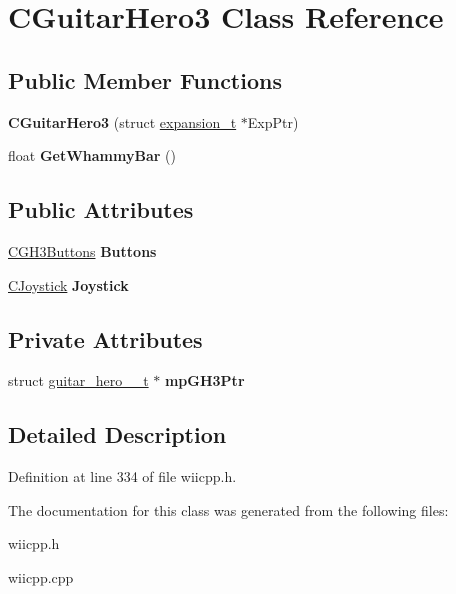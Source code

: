 \hypertarget{class_c_guitar_hero3}{\section{\-C\-Guitar\-Hero3 \-Class \-Reference}
\label{class_c_guitar_hero3}
}
\subsection*{\-Public \-Member \-Functions}
\begin{DoxyCompactItemize}
\item 
\hypertarget{class_c_guitar_hero3_afbef4e83211e146d2aef1064fcc24bb7}{{\bfseries \-C\-Guitar\-Hero3} (struct \hyperlink{structexpansion__t}{expansion\-\_\-t} $\ast$\-Exp\-Ptr)}\label{class_c_guitar_hero3_afbef4e83211e146d2aef1064fcc24bb7}

\item 
\hypertarget{class_c_guitar_hero3_ae4066620ae4ba771306e6439968504e6}{float {\bfseries \-Get\-Whammy\-Bar} ()}\label{class_c_guitar_hero3_ae4066620ae4ba771306e6439968504e6}

\end{DoxyCompactItemize}
\subsection*{\-Public \-Attributes}
\begin{DoxyCompactItemize}
\item 
\hypertarget{class_c_guitar_hero3_a70e8e38de7e281c5a7af18cf09747d48}{\hyperlink{class_c_g_h3_buttons}{\-C\-G\-H3\-Buttons} {\bfseries \-Buttons}}\label{class_c_guitar_hero3_a70e8e38de7e281c5a7af18cf09747d48}

\item 
\hypertarget{class_c_guitar_hero3_a2a91b61b396cf329e979a66c729c3768}{\hyperlink{class_c_joystick}{\-C\-Joystick} {\bfseries \-Joystick}}\label{class_c_guitar_hero3_a2a91b61b396cf329e979a66c729c3768}

\end{DoxyCompactItemize}
\subsection*{\-Private \-Attributes}
\begin{DoxyCompactItemize}
\item 
\hypertarget{class_c_guitar_hero3_acc60e4790cac101dfc4812371efcd476}{struct \hyperlink{structguitar__hero__3__t}{guitar\-\_\-hero\-\_\-\_\-t} $\ast$ {\bfseries mp\-G\-H3\-Ptr}}\label{class_c_guitar_hero3_acc60e4790cac101dfc4812371efcd476}

\end{DoxyCompactItemize}


\subsection{\-Detailed \-Description}


\-Definition at line 334 of file wiicpp.\-h.



\-The documentation for this class was generated from the following files\-:\begin{DoxyCompactItemize}
\item 
wiicpp.\-h\item 
wiicpp.\-cpp\end{DoxyCompactItemize}
